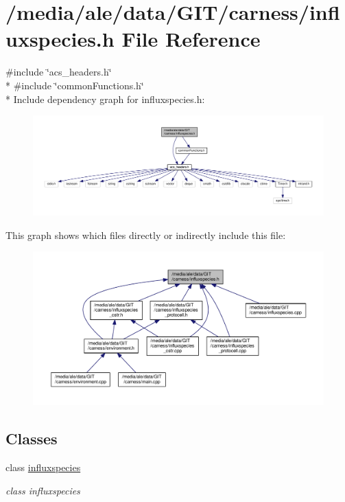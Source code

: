 \hypertarget{a00034}{\section{/media/ale/data/\-G\-I\-T/carness/influxspecies.h File Reference}
\label{a00034}
}
{\ttfamily \#include \char`\"{}acs\-\_\-headers.\-h\char`\"{}}\\*
{\ttfamily \#include \char`\"{}common\-Functions.\-h\char`\"{}}\\*
Include dependency graph for influxspecies.\-h\-:\nopagebreak
\begin{figure}[H]
\begin{center}
\leavevmode
\includegraphics[width=350pt]{a00065}
\end{center}
\end{figure}
This graph shows which files directly or indirectly include this file\-:\nopagebreak
\begin{figure}[H]
\begin{center}
\leavevmode
\includegraphics[width=350pt]{a00066}
\end{center}
\end{figure}
\subsection*{Classes}
\begin{DoxyCompactItemize}
\item 
class \hyperlink{a00013}{influxspecies}
\begin{DoxyCompactList}\small\item\em class influxspecies \end{DoxyCompactList}\end{DoxyCompactItemize}
